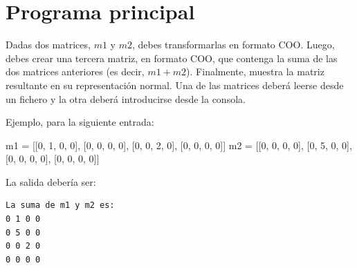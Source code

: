 \documentclass[10pt,a4paper]{article}
\begin{document}
\section*{Programa principal}

Dadas dos matrices, $m1$ y $m2$, debes transformarlas en formato COO. Luego, debes crear una tercera matriz, en formato COO, que contenga la suma de las dos matrices anteriores (es decir, $m1 + m2$). Finalmente, muestra la matriz resultante en su representación normal. Una de las matrices deberá leerse desde un fichero y la otra deberá introducirse desde la consola.

Ejemplo, para la siguiente entrada:
\begin{attachedlisting}[sparse8]
m1 = [[0, 1, 0, 0],
      [0, 0, 0, 0],
      [0, 0, 2, 0],
      [0, 0, 0, 0]]
m2 = [[0, 0, 0, 0],
      [0, 5, 0, 0],
      [0, 0, 0, 0],
      [0, 0, 0, 0]]
\end{attachedlisting}

La salida debería ser:
\begin{lstlisting}
La suma de m1 y m2 es:
0 1 0 0
0 5 0 0
0 0 2 0
0 0 0 0
\end{lstlisting}
\end{document}
